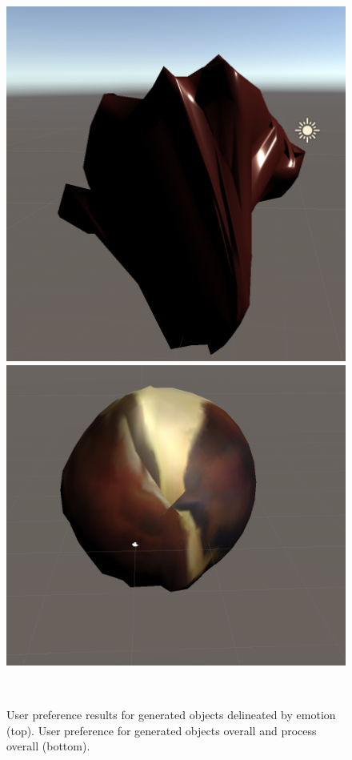 \documentclass{sigchi}
\begin{document}
\begin{figure}
  \centering
  \includegraphics[width=2\columnwidth]{figures/angryobject}
  \includegraphics[width=2\columnwidth]{figures/angryGAN}
  \caption{User preference results for generated objects delineated by emotion (top). User preference for generated objects overall and process overall (bottom).}~\label{fig:figure4}
\end{figure}
\end{document}
